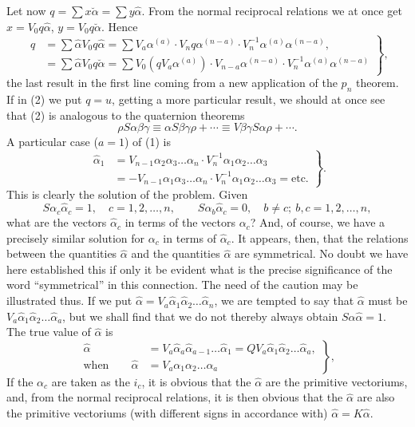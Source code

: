 \documentclass[11pt]{article}
\begin{document}
\indent Let now $q=\sum x\breve\alpha=\sum y\hat\alpha$. From the normal reciprocal relations we at once get $x=V_0q\hat\alpha$, $y=V_0q\breve\alpha$. Hence
\begin{equation}\left.\begin{aligned}q&=\sum\hat\alpha V_0q\hat\alpha=\sum V_a\alpha^{(a)}\cdot V_nq\alpha^{(n-a)}\cdot V_n^{-1}\alpha^{(a)}\alpha^{(n-a)},\\&=\sum\hat\alpha V_0q\breve\alpha=\sum V_0(qV_a\alpha^{(a)})\cdot V_{n-a}\alpha^{(n-a)}\cdot V_n^{-1}\alpha^{(a)}\alpha^{(n-a)}\end{aligned}\right\},\tag{2}\end{equation}
the last result in the first line coming from a new application of the $p_n$ theorem. If in (2) we put $q=u$, getting a more particular result, we should at once see that (2) is analogous to the quaternion theorems
\[\rho S\alpha\beta\gamma\equiv\alpha S\beta\gamma\rho+\cdots\equiv V\beta\gamma S\alpha\rho+\cdots.\]
A particular case ($a=1$) of (1) is
\begin{equation}\left.\begin{aligned}\hat\alpha_1&=V_{n-1}\alpha_2\alpha_3\ldots\alpha_n\cdot V_n^{-1}\alpha_1\alpha_2\ldots\alpha_3\\&=-V_{n-1}\alpha_1\alpha_3\ldots\alpha_n\cdot V_n^{-1}\alpha_1\alpha_2\ldots\alpha_3=\text{etc.}\end{aligned}\right\}.\tag{3}\end{equation}
This is clearly the solution of the problem. Given
\[S\alpha_c\hat\alpha_c=1,\quad c=1,2,\ldots,n,\qquad S\alpha_b\hat\alpha_c=0,\quad b\ne c;\ b,c=1,2,\ldots,n,\]
what are the vectors $\hat\alpha_c$ in terms of the vectors $\alpha_c$? And, of course, we have a precisely similar solution for $\alpha_c$ in terms of $\hat\alpha_c$. It appears, then, that the relations between the quantities $\hat\alpha$ and the quantities $\hat\alpha$ are symmetrical. No doubt we have here established this if only it be evident what is the precise significance of the word ``symmetrical'' in this connection. The need of the caution may be illustrated thus. If we put $\hat\alpha=V_a\hat\alpha_1\hat\alpha_2\ldots\hat\alpha_n$, we are tempted to say that $\hat\alpha$ must be $V_a\hat\alpha_1\hat\alpha_2\ldots\hat\alpha_a$, but we shall find that we do not thereby always obtain $S\hat\alpha\hat\alpha=1$. The true value of $\hat\alpha$ is
\begin{equation}\left.\begin{aligned}\hat\alpha&=V_a\hat\alpha_a\hat\alpha_{a-1}\ldots\hat\alpha_1=QV_a\hat\alpha_1\hat\alpha_2\ldots\hat\alpha_a,\\\text{when}\qquad\hat\alpha&=V_a\alpha_1\alpha_2\ldots\alpha_a\end{aligned}\right\},\tag{4}\end{equation}
If the $\alpha_c$ are taken as the $i_c$, it is obvious that the $\hat\alpha$ are the primitive vectoriums, and, from the normal reciprocal relations, it is then obvious that the $\hat\alpha$ are also the primitive vectoriums (with different signs in accordance with) $\hat\alpha=K\hat\alpha$.
\end{document}
